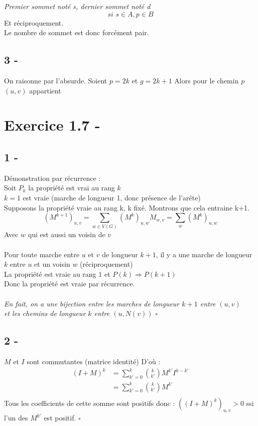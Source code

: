 \documentclass{article}
\begin{document}
            \textit{Premier sommet noté s, dernier sommet noté d}
            $$
            \textit{si } s \in A, p \in B 
            $$
            Et réciproquement.\\
            Le nombre de sommet est donc forcément pair.
        \subsection*{3 -}
        On raisonne par l'absurde.
        Soient $p=2k$ et $g=2k+1$
        Alors pour le chemin $p$ $(u,v)$ appartient
    \section*{Exercice 1.7 -}
        \subsection*{1 -}
            Démonstration par récurrence :\\
            Soit $P_{k}$ la propriété est vrai au rang $k$\\
            $k=1$ est vraie (marche de longueur 1, donc présence de l'arête)\\
            Supposons la propriété vraie au rang k, k fixé. Montrons que cela entraine k+1.\\
            $$
                \left(M^{k+1}\right)_{u,v} = \sum_{w \in V(G)} \left(M^{k}\right)_{u,w} M_{w,v}
                = \sum_{w} \left(M^{k}\right)_{u,w}
            $$
            Avec $w$ qui est aussi un voisin de $v$\\\\
            Pour toute marche entre $u$ et $v$ de longueur $k+1$, il y a une marche de longueur $k$ entre $u$ et un voisin $w$ (réciproquement)\\
            La propriété est vraie au rang $1$ et $P(k) \Rightarrow P(k+1)$\\
            Donc la propriété est vraie par récurrence.\\\\
            \textit{En fait, on a une bijection entre les marches de longueur $k+1$ entre $(u,v)$\\ et les chemins de longueur $k$
            entre $(u,N(v))$}
            $\square$
        \subsection*{2 -}
            $M$ et $I$ sont commutantes (matrice identité)
            D'où :
            \begin{align*}
            \left(I+M\right)^{k} &= \sum_{k'=0}^{k} \binom{k}{k'}M^{k'}I^{k-k'}\\
            &= \sum_{k'=0}^{k} \binom{k}{k'}M^{k'}\\
            \end{align*}
            Tous les coefficients de cette somme sont positifs donc :
            $\left( \left(I+M\right)^{k} \right)_{u,v} > 0$
            ssi l'un des $M^{k'}$ est positif. $\square$
\end{document}
